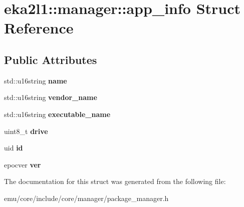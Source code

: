 \hypertarget{structeka2l1_1_1manager_1_1app__info}{}\section{eka2l1\+:\+:manager\+:\+:app\+\_\+info Struct Reference}
\label{structeka2l1_1_1manager_1_1app__info}
\subsection*{Public Attributes}
\begin{DoxyCompactItemize}
\item 
\mbox{\label{structeka2l1_1_1manager_1_1app__info_ac702461b9ba739c6d84d508c89cff8c7}} 
std\+::u16string {\bfseries name}
\item 
\mbox{\label{structeka2l1_1_1manager_1_1app__info_a335f1c46a03ed6d2e898241cbe80497b}} 
std\+::u16string {\bfseries vendor\+\_\+name}
\item 
\mbox{\label{structeka2l1_1_1manager_1_1app__info_a68d1aca60ad076caadc8d938537e7123}} 
std\+::u16string {\bfseries executable\+\_\+name}
\item 
\mbox{\label{structeka2l1_1_1manager_1_1app__info_ab042049203deba7df83a6cb0b1f5e362}} 
uint8\+\_\+t {\bfseries drive}
\item 
\mbox{\label{structeka2l1_1_1manager_1_1app__info_ae1138d712ea77b31636ae277c1ee36a6}} 
uid {\bfseries id}
\item 
\mbox{\label{structeka2l1_1_1manager_1_1app__info_a8e74045673c65ed8117e08e27b451e33}} 
epocver {\bfseries ver}
\end{DoxyCompactItemize}


The documentation for this struct was generated from the following file\+:\begin{DoxyCompactItemize}
\item 
emu/core/include/core/manager/package\+\_\+manager.\+h\end{DoxyCompactItemize}
